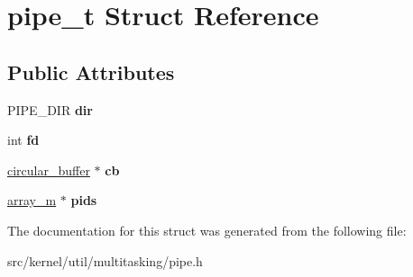 \hypertarget{structpipe__t}{}\section{pipe\+\_\+t Struct Reference}
\label{structpipe__t}
\subsection*{Public Attributes}
\begin{DoxyCompactItemize}
\item 
\mbox{\label{structpipe__t_ab837f634793afd7c0db28b41eefcd1ff}} 
P\+I\+P\+E\+\_\+\+D\+IR {\bfseries dir}
\item 
\mbox{\label{structpipe__t_a1805b07608c6f2a5ea391e7b4460bacc}} 
int {\bfseries fd}
\item 
\mbox{\label{structpipe__t_acdafcd8008da3bea995d6e09bda95884}} 
\hyperlink{structcircular__buffer}{circular\+\_\+buffer} $\ast$ {\bfseries cb}
\item 
\mbox{\label{structpipe__t_a2e62beada00252d422000edda5874297}} 
\hyperlink{structarray__m}{array\+\_\+m} $\ast$ {\bfseries pids}
\end{DoxyCompactItemize}


The documentation for this struct was generated from the following file\+:\begin{DoxyCompactItemize}
\item 
src/kernel/util/multitasking/pipe.\+h\end{DoxyCompactItemize}
